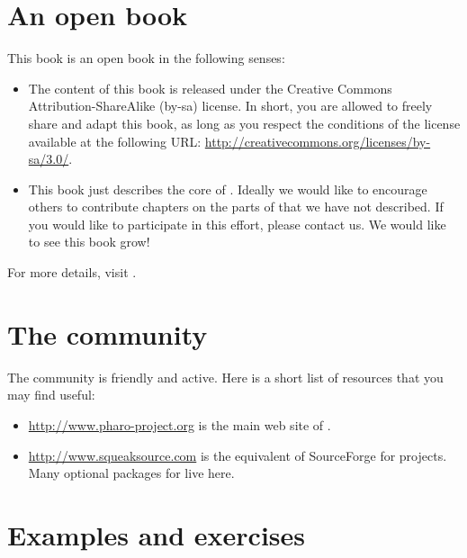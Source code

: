 \documentclass[a4paper,spanish, 10pt,twoside]{book}
\begin{document}
\section*{An open book}

This book is an open book in the following senses: 

\begin{itemize}

\item	The content of this book is released under the Creative Commons Attribution-ShareAlike (by-sa) license.
		In short, you are allowed to freely share and adapt this book, as long as you respect the conditions of the license available at the following URL: 
		\url{http://creativecommons.org/licenses/by-sa/3.0/}.

\item	This book just describes the core of \pharo.
		Ideally we would like to encourage others to contribute chapters
		on the parts of \pharo that we have not described.
		If you would like to participate in this effort, please
		contact us.  We would like to see this book grow!
\end{itemize}

For more details, visit \pbe.

\section*{The \pharo community}

The \pharo community is friendly and active.
Here is a short list of resources that you may find useful:

\begin{itemize}
\item \url{http://www.pharo-project.org} is the main web site of \pharo.

\item \url{http://www.squeaksource.com} is the equivalent of SourceForge for \pharo projects.
Many optional packages for \pharo live here.
\end{itemize}

\section*{Examples and exercises}
\end{document}
